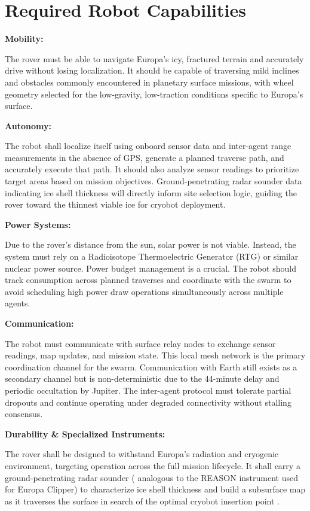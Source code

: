 \documentclass[11pt]{article}
\begin{document}
\section*{Required Robot Capabilities}

\noindent\textbf{Mobility:}

The rover must be able to navigate Europa's icy, fractured terrain and accurately drive without losing
localization. It should be capable of traversing mild inclines and obstacles commonly encountered in
planetary surface missions, with wheel geometry selected for the low-gravity, low-traction conditions
specific to Europa's surface.

\noindent\textbf{Autonomy:}

The robot shall localize itself using onboard sensor data and inter-agent range measurements in the
absence of GPS, generate a planned traverse path, and accurately execute that path. It should also
analyze sensor readings to prioritize target areas based on mission objectives. Ground-penetrating
radar sounder data indicating ice shell thickness will directly inform site selection logic, guiding
the rover toward the thinnest viable ice for cryobot deployment.

\noindent\textbf{Power Systems:}

Due to the rover's distance from the sun, solar power is not viable. Instead, the system must rely on a
Radioisotope Thermoelectric Generator (RTG) or similar nuclear power source. Power budget management
is a crucial. The robot should track consumption across planned traverses and coordinate with the
swarm to avoid scheduling high power draw operations simultaneously across multiple agents.

\noindent\textbf{Communication:}

The robot must communicate with surface relay nodes to exchange sensor readings, map updates, and
mission state. This local mesh network is the primary coordination channel for the swarm. Communication
with Earth still exists as a secondary channel but is non-deterministic due to the 44-minute delay and
periodic occultation by Jupiter. The inter-agent protocol must tolerate partial dropouts and continue
operating under degraded connectivity without stalling consensus.

\noindent\textbf{Durability \& Specialized Instruments:}

The rover shall be designed to withstand Europa's radiation and cryogenic environment, targeting
operation across the full mission lifecycle. It shall carry a ground-penetrating radar sounder (
analogous to the REASON instrument used for Europa Clipper) to characterize ice shell
thickness and build a subsurface map as it traverses the surface in search of the optimal cryobot
insertion point \cite{owlDecadal}.
\end{document}
